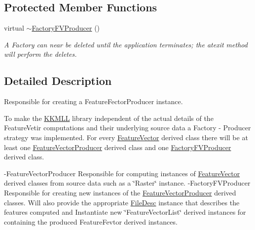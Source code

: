 \subsection*{Protected Member Functions}
\begin{DoxyCompactItemize}
\item 
virtual \hyperlink{class_k_k_m_l_l_1_1_factory_f_v_producer_a2103d5639265b3aa1953310c4a6e8021}{$\sim$\+Factory\+F\+V\+Producer} ()
\begin{DoxyCompactList}\small\item\em A Factory can near be deleted until the application terminates; the atexit method will perform the deletes. \end{DoxyCompactList}\end{DoxyCompactItemize}


\subsection{Detailed Description}
Responsible for creating a Feature\+Fector\+Producer instance. 

To make the \textquotesingle{}\hyperlink{namespace_k_k_m_l_l}{K\+K\+M\+LL}\textquotesingle{} library independent of the actual details of the Feature\+Vetir computations and their underlying source data a Factory -\/ Producer strategy was implemented. For every \hyperlink{class_k_k_m_l_l_1_1_feature_vector}{Feature\+Vector} derived class there will be at least one \textquotesingle{}\hyperlink{class_k_k_m_l_l_1_1_feature_vector_producer}{Feature\+Vector\+Producer}\textquotesingle{} derived class and one \textquotesingle{}\hyperlink{class_k_k_m_l_l_1_1_factory_f_v_producer}{Factory\+F\+V\+Producer}\textquotesingle{} derived class.

-\/\+Feature\+Vector\+Producer Responsible for computing instances of \textquotesingle{}\hyperlink{class_k_k_m_l_l_1_1_feature_vector}{Feature\+Vector}\textquotesingle{} derived classes from source data such as a \char`\"{}\+Raster\char`\"{} instance. -\/\+Factory\+F\+V\+Producer Responsible for creating new instances of the \textquotesingle{}\hyperlink{class_k_k_m_l_l_1_1_feature_vector_producer}{Feature\+Vector\+Producer}\textquotesingle{} derived classes. Will also provide the appropriate \textquotesingle{}\hyperlink{class_k_k_m_l_l_1_1_file_desc}{File\+Desc}\textquotesingle{} instance that describes the features computed and Instantiate new \char`\"{}\+Feature\+Vector\+List\char`\"{} derived instances for containing the produced Feature\+Fevtor derived instances.

